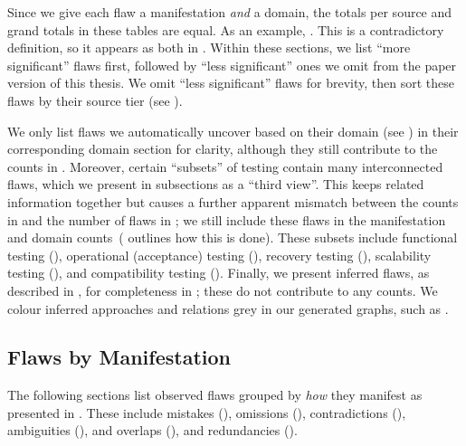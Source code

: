 Since we give each flaw a manifestation \emph{and} a domain, the totals per
source and grand totals in these tables are equal. As an example, \tourFlaw*{}.
This is a contradictory definition, so it appears \ifnotpaper as both \else in
\fi {}. Within these sections, we \ifnotpaper
    list ``more significant'' flaws first, followed by ``less significant''
    ones we omit from the paper version of this thesis. We \else
    omit ``less significant'' flaws for brevity, \fi then sort these flaws
by their source tier (see ).

We only list flaws we automatically uncover based on their domain \ifnotpaper
    (see ) \fi in their corresponding
domain section for clarity, although they still contribute to the counts in
. Moreover, certain ``subsets'' of testing contain many
interconnected flaws, which we present in subsections as a ``third view''. This
keeps related information together but causes a further apparent mismatch
between the counts in  and the number of
flaws in ; we still include these flaws in the
manifestation and domain counts\ifnotpaper\ ( outlines
    how this is done)\fi. These subsets include functional testing
(), \ifnotpaper operational (acceptance) testing
    (), \fi recovery testing (), scalability
testing (), and compatibility testing ().
\ifnotpaper Finally, we present inferred flaws, as described in ,
    for completeness in ; these do not contribute to any
    counts. %
    We colour inferred approaches and relations grey in our generated graphs,
    such as \recFigs{}.


    \begin{landscape}
        \flawMnfstsTable{}
        \flawDmnsTable{}
    \end{landscape}

\fi

\subsection{Flaws by Manifestation}\label{flawMnfsts}

The following sections list observed flaws grouped by \emph{how} they manifest
as presented in . These include mistakes (),
omissions (), contradictions (), ambiguities
(), \ifnotpaper \else and \fi overlaps ()\ifnotpaper,
and redundancies ()\fi.

